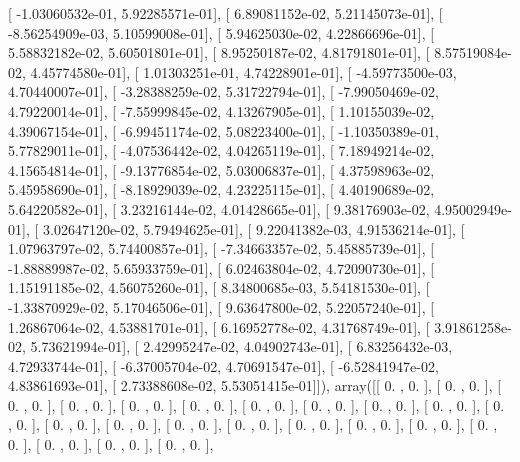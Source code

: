 \documentclass{article}
\begin{document}
       [ -1.03060532e-01,   5.92285571e-01],
       [  6.89081152e-02,   5.21145073e-01],
       [ -8.56254909e-03,   5.10599008e-01],
       [  5.94625030e-02,   4.22866696e-01],
       [  5.58832182e-02,   5.60501801e-01],
       [  8.95250187e-02,   4.81791801e-01],
       [  8.57519084e-02,   4.45774580e-01],
       [  1.01303251e-01,   4.74228901e-01],
       [ -4.59773500e-03,   4.70440007e-01],
       [ -3.28388259e-02,   5.31722794e-01],
       [ -7.99050469e-02,   4.79220014e-01],
       [ -7.55999845e-02,   4.13267905e-01],
       [  1.10155039e-02,   4.39067154e-01],
       [ -6.99451174e-02,   5.08223400e-01],
       [ -1.10350389e-01,   5.77829011e-01],
       [ -4.07536442e-02,   4.04265119e-01],
       [  7.18949214e-02,   4.15654814e-01],
       [ -9.13776854e-02,   5.03006837e-01],
       [  4.37598963e-02,   5.45958690e-01],
       [ -8.18929039e-02,   4.23225115e-01],
       [  4.40190689e-02,   5.64220582e-01],
       [  3.23216144e-02,   4.01428665e-01],
       [  9.38176903e-02,   4.95002949e-01],
       [  3.02647120e-02,   5.79494625e-01],
       [  9.22041382e-03,   4.91536214e-01],
       [  1.07963797e-02,   5.74400857e-01],
       [ -7.34663357e-02,   5.45885739e-01],
       [ -1.88889987e-02,   5.65933759e-01],
       [  6.02463804e-02,   4.72090730e-01],
       [  1.15191185e-02,   4.56075260e-01],
       [  8.34800685e-03,   5.54181530e-01],
       [ -1.33870929e-02,   5.17046506e-01],
       [  9.63647800e-02,   5.22057240e-01],
       [  1.26867064e-02,   4.53881701e-01],
       [  6.16952778e-02,   4.31768749e-01],
       [  3.91861258e-02,   5.73621994e-01],
       [  2.42995247e-02,   4.04902743e-01],
       [  6.83256432e-03,   4.72933744e-01],
       [ -6.37005704e-02,   4.70691547e-01],
       [ -6.52841947e-02,   4.83861693e-01],
       [  2.73388608e-02,   5.53051415e-01]]), array([[ 0.        ,  0.        ],
       [ 0.        ,  0.        ],
       [ 0.        ,  0.        ],
       [ 0.        ,  0.        ],
       [ 0.        ,  0.        ],
       [ 0.        ,  0.        ],
       [ 0.        ,  0.        ],
       [ 0.        ,  0.        ],
       [ 0.        ,  0.        ],
       [ 0.        ,  0.        ],
       [ 0.        ,  0.        ],
       [ 0.        ,  0.        ],
       [ 0.        ,  0.        ],
       [ 0.        ,  0.        ],
       [ 0.        ,  0.        ],
       [ 0.        ,  0.        ],
       [ 0.        ,  0.        ],
       [ 0.        ,  0.        ],
       [ 0.        ,  0.        ],
       [ 0.        ,  0.        ],
       [ 0.        ,  0.        ],
       [ 0.        ,  0.        ],
\end{document}
